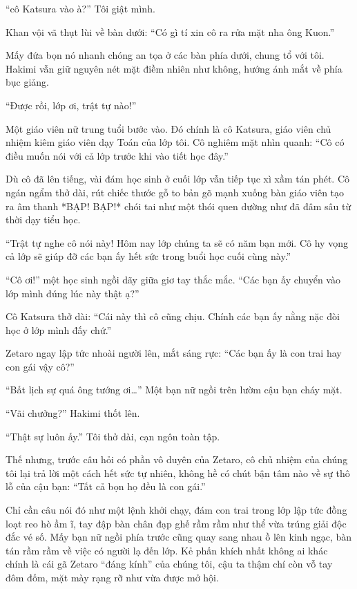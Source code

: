 \documentclass[../main.tex]{subfiles}
\begin{document}
``cô Katsura vào à?'' Tôi giật mình.

Khan vội vã thụt lùi về bàn dưới: ``Có gì tí xin cô ra rửa mặt nha ông Kuon.''

Mấy đứa bọn nó nhanh chóng an tọa ở các bàn phía dưới, chung tổ với tôi. Hakimi vẫn giữ nguyên nét mặt điềm nhiên như không, hướng ánh mắt về phía bục giảng.

``Được rồi, lớp ơi, trật tự nào!''

Một giáo viên nữ trung tuổi bước vào. Đó chính là cô Katsura, giáo viên chủ nhiệm kiêm giáo viên dạy Toán của lớp tôi. Cô nghiêm mặt nhìn quanh: ``Cô có điều muốn nói với cả lớp trước khi vào tiết học đây.''

Dù cô đã lên tiếng, vài đám học sinh ở cuối lớp vẫn tiếp tục xì xầm tán phét. Cô ngán ngẩm thở dài, rút chiếc thước gỗ to bản gõ mạnh xuống bàn giáo viên tạo ra âm thanh *BẠP! BẠP!* chói tai như một thói quen dường như đã đâm sâu từ thời dạy tiểu học.

``Trật tự nghe cô nói này! Hôm nay lớp chúng ta sẽ có năm bạn mới. Cô hy vọng cả lớp sẽ giúp đỡ các bạn ấy hết sức trong buổi học cuối cùng này.''

``Cô ơi!'' một học sinh ngồi dãy giữa giơ tay thắc mắc. ``Các bạn ấy chuyển vào lớp mình đúng lúc này thật ạ?''

Cô Katsura thở dài: ``Cái này thì cô cũng chịu. Chính các bạn ấy nằng nặc đòi học ở lớp mình đấy chứ.''

Zetaro ngay lập tức nhoài người lên, mắt sáng rực: ``Các bạn ấy là con trai hay con gái vậy cô?''

``Bất lịch sự quá ông tướng ơi\dots'' Một bạn nữ ngồi trên lườm cậu bạn cháy mặt.

``Vãi chưởng?'' Hakimi thốt lên.

``Thật sự luôn ấy.'' Tôi thở dài, cạn ngôn toàn tập.

Thế nhưng, trước câu hỏi có phần vô duyên của Zetaro, cô chủ nhiệm của chúng tôi lại trả lời một cách hết sức tự nhiên, không hề có chút bận tâm nào về sự thô lỗ của cậu bạn: ``Tất cả bọn họ đều là con gái.''

Chỉ cần câu nói đó như một lệnh khởi chạy, đám con trai trong lớp lập tức đồng loạt reo hò ầm ĩ, tay đập bàn chân đạp ghế rầm rầm như thể vừa trúng giải độc đắc vé số. Mấy bạn nữ ngồi phía trước cũng quay sang nhau ồ lên kinh ngạc, bàn tán rầm rầm về việc có người lạ đến lớp. Kẻ phấn khích nhất không ai khác chính là cái gã Zetaro ``đáng kính'' của chúng tôi, cậu ta thậm chí còn vỗ tay đôm đốm, mặt mày rạng rỡ như vừa được mở hội.
\end{document}
